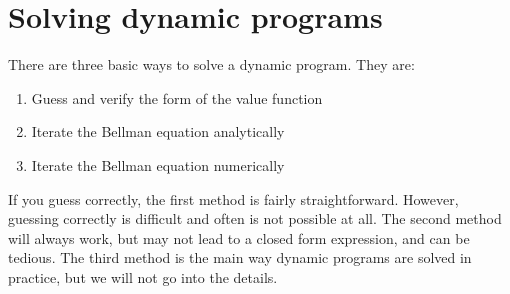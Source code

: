 \section{Solving dynamic programs} 

There are three basic ways to solve a dynamic program. They are:
\begin{enumerate}
\item Guess and verify the form of the value function
\item Iterate the Bellman equation analytically
\item Iterate the Bellman equation numerically
\end{enumerate}
If you guess correctly, the first method is fairly
straightforward. However, guessing correctly is difficult and often is
not possible at all. The second method will always work, but may not
lead to a closed form expression, and can be tedious. The third method
is the main way dynamic programs are solved in practice, but we will
not go into the details.

